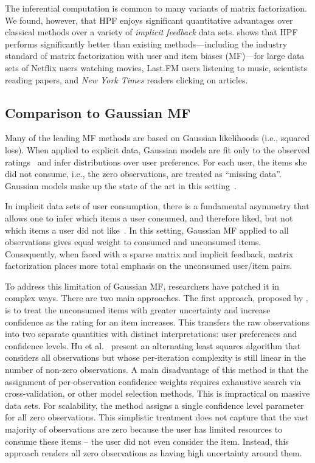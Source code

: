 The inferential computation is common to many variants of matrix
factorization.  We found, however, that HPF enjoys significant
quantitative advantages over classical methods over a variety of
\emph{implicit feedback} data sets.  shows
that HPF performs significantly better than existing
methods---including the industry standard of matrix factorization with
user and item biases (MF)---for large data sets of Netflix users
watching movies, Last.FM users listening to music, scientists reading
papers, and \textit{New York Times} readers clicking on articles.

\subsection{Comparison to Gaussian MF}
Many of the leading MF methods are based on Gaussian likelihoods
(i.e., squared loss). When applied to explicit data, Gaussian models
are fit only to the observed ratings~\cite{Koren:2009} and infer
distributions over user preference. For each user, the items she did
not consume, i.e., the zero observations, are treated as ``missing
data''. Gaussian models make up the state of the art in this
setting~\cite{Salakhutdinov:2008, Salakhutdinov:2008a,Koren:2009}.

In implicit data sets of user consumption, there is a fundamental
asymmetry that allows one to infer which items a user consumed, and
therefore liked, but not which items a user did not
like~\cite{Hu:2008p9402}. In this setting, Gaussian MF applied to all
observations gives equal weight to consumed and unconsumed items.
Consequently, when faced with a sparse matrix and implicit feedback,
matrix factorization places more total emphasis on the unconsumed
user/item pairs.

To address this limitation of Gaussian MF, researchers have patched it
in complex ways. There are two main approaches. The first approach,
proposed by \cite{Hu:2008p9402}, is to treat the unconsumed items with
greater uncertainty and increase confidence as the rating for an item
increases. This transfers the raw observations into two separate
quantities with distinct interpretations: user preferences and
confidence levels. Hu et al.~\cite{Hu:2008p9402} present an
alternating least squares algorithm that considers all observations
but whose per-iteration complexity is still linear in the number of
non-zero observations. A main disadvantage of this method is that the
assignment of per-observation confidence weights requires exhaustive
search via cross-validation, or other model selection methods. This is
impractical on massive data sets. For scalability, the method assigns
a single confidence level parameter for all zero observations. This
simplistic treatment does not capture that the vast majority of
observations are zero because the user has limited resources to
consume these items -- the user did not even consider the item.
Instead, this approach renders all zero observations as having high
uncertainty around them.

